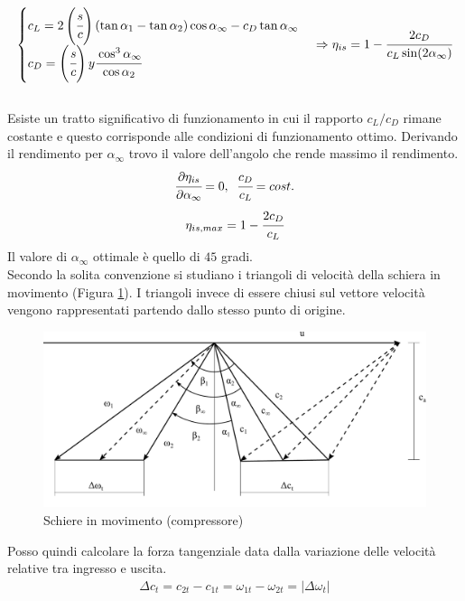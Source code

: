 \begin{align*}
\begin{cases}
c_L = 2 \left(  \cfrac{s}{c} \right) (\tan \alpha_1 - \tan \alpha_2) \cos \alpha_{\infty} - c_D \tan \alpha_{\infty}\\
c_D= \left(  \cfrac{s}{c} \right) y \cfrac{\cos^3 \alpha_{\infty}}{\cos \alpha_2}
\end{cases}
\Rightarrow
\eta_{is} = 1- \cfrac{2 c_D}{c_L \sin (2 \alpha_{\infty})}
\end{align*}
\\Esiste un tratto significativo di funzionamento in cui il rapporto $c_L/c_D$ rimane costante e questo corrisponde alle condizioni di funzionamento ottimo. Derivando il rendimento per $\alpha_{\infty}$ trovo il valore dell'angolo che rende massimo il rendimento.
\begin{align*}
\cfrac{\partial \eta_{is}}{\partial \alpha_{\infty}} = 0, \;\; \cfrac{c_D}{c_L} = cost.
\end{align*}
\begin{align*}
\eta_{is,max} = 1- \cfrac{2 c_D}{c_L}
\end{align*}
Il valore di $\alpha_{\infty}$ ottimale è quello di $45$ gradi.\\
Secondo la solita convenzione si studiano i triangoli di velocità della schiera in movimento (Figura \ref{fig:SchiereCompr}). I triangoli invece di essere chiusi sul vettore velocità vengono rappresentati partendo dallo stesso punto di origine. 
\begin{figure}
\centering
  \includegraphics[width=\textwidth]{fig/SchiereCompr.pdf}
\caption{Schiere in movimento (compressore)}
\label{fig:SchiereCompr}
\end{figure}
Posso quindi calcolare la forza tangenziale data dalla variazione delle velocità relative tra ingresso e uscita.
\begin{align*}
\Delta c_t = c_{2t} - c_{1t} = \omega_{1t} - \omega_{2t} = |\Delta \omega_t |
\end{align*}
